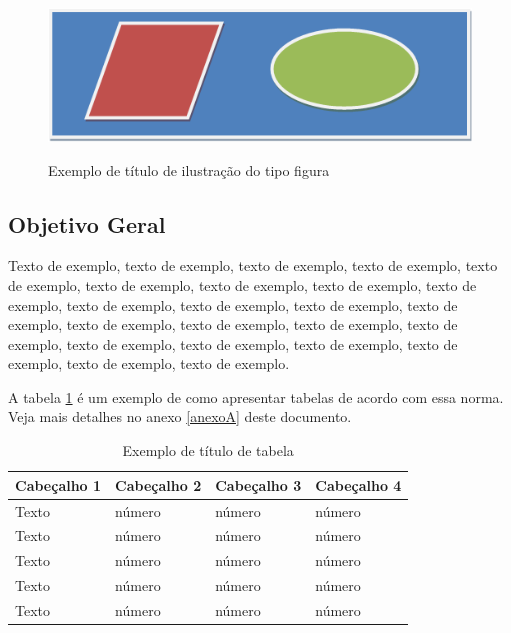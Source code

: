 \documentclass[
	12pt,				%
	oneside,			%
	a4paper,			%
	english,			%
	brazil				%
	]{abntex2ppgsi}
\begin{document}
\begin{figure}[htbp]
	\centering
	\caption{Exemplo de título de ilustração do tipo figura}
		\includegraphics{figuras/figura-exemplo.png}
	\label{fig:figura-exemplo3}
\end{figure}

\subsection{Objetivo Geral}

Texto de exemplo, texto de exemplo, texto de exemplo, texto de exemplo, texto de exemplo, texto de exemplo, texto de exemplo, texto de exemplo, texto de exemplo, texto de exemplo, texto de exemplo, texto de exemplo, texto de exemplo, texto de exemplo, texto de exemplo, texto de exemplo, texto de exemplo, texto de exemplo, texto de exemplo, texto de exemplo, texto de exemplo, texto de exemplo, texto de exemplo.

A tabela \ref{tab:ExemploDeTabela3} é um exemplo de como apresentar tabelas de acordo com essa norma. Veja mais detalhes no anexo \ref{anexoA} deste documento.

\begin{table}[htbp]
	\centering
	\caption{Exemplo de título de tabela}
		\begin{tabular}{p{0.85in} p{0.85in} p{0.85in} p{0.85in} } \hline
		
		Cabeçalho 1	& Cabeçalho 2	& Cabeçalho 3	& Cabeçalho 4 \\ \hline
		Texto	& número & número	& número \\ 
		Texto	& número & número	& número \\ 
		Texto	& número & número	& número \\ 
		Texto	& número & número	& número \\ 
		Texto	& número & número	& número \\ \hline
			
		\end{tabular}
	\label{tab:ExemploDeTabela3}
\end{table}
\end{document}
